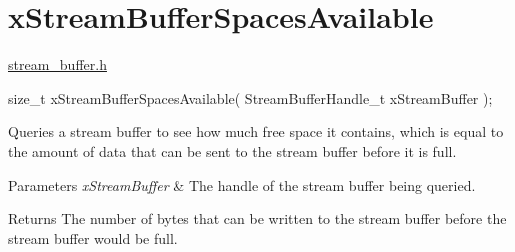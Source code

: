 \hypertarget{group__x_stream_buffer_spaces_available}{}\section{x\+Stream\+Buffer\+Spaces\+Available}
\label{group__x_stream_buffer_spaces_available}
\mbox{\hyperlink{stream__buffer_8h_source}{stream\+\_\+buffer.\+h}}


\begin{DoxyPre}
size\_t xStreamBufferSpacesAvailable( StreamBufferHandle\_t xStreamBuffer );
\end{DoxyPre}


Queries a stream buffer to see how much free space it contains, which is equal to the amount of data that can be sent to the stream buffer before it is full.


\begin{DoxyParams}{Parameters}
{\em x\+Stream\+Buffer} & The handle of the stream buffer being queried.\\
\hline
\end{DoxyParams}
\begin{DoxyReturn}{Returns}
The number of bytes that can be written to the stream buffer before the stream buffer would be full. 
\end{DoxyReturn}

